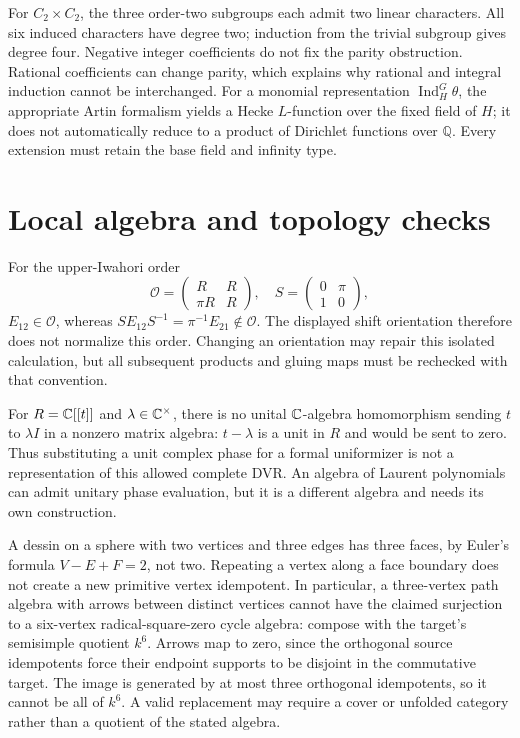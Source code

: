 For $C_2\times C_2$, the three order-two subgroups each admit two linear
characters. All six induced characters have degree two; induction from
the trivial subgroup gives degree four. Negative integer coefficients do
not fix the parity obstruction. Rational coefficients can change parity,
which explains why rational and integral induction cannot be interchanged.
For a monomial representation $\operatorname{Ind}_H^G\theta$, the appropriate
Artin formalism yields a Hecke $L$-function over the fixed field of $H$;
it does not automatically reduce to a product of Dirichlet functions over
$\mathbb Q$. Every extension must retain the base field and infinity type.

\section{Local algebra and topology checks}
For the upper-Iwahori order
\[
 \mathcal O=\begin{pmatrix}R&R\\\pi R&R\end{pmatrix},\quad
 S=\begin{pmatrix}0&\pi\\1&0\end{pmatrix},
\]
$E_{12}\in\mathcal O$, whereas
$SE_{12}S^{-1}=\pi^{-1}E_{21}\notin\mathcal O$.
The displayed shift orientation therefore does not normalize this order.
Changing an orientation may repair this isolated calculation, but all
subsequent products and gluing maps must be rechecked with that convention.

For $R=\mathbb C[[t]]$ and $\lambda\in\mathbb C^\times$, there is no unital
$\mathbb C$-algebra homomorphism sending $t$ to $\lambda I$ in a nonzero matrix
algebra: $t-\lambda$ is a unit in $R$ and would be sent to zero.
Thus substituting a unit complex phase for a formal uniformizer is not a
representation of this allowed complete DVR. An algebra of Laurent
polynomials can admit unitary phase evaluation, but it is a different
algebra and needs its own construction.

A dessin on a sphere with two vertices and three edges has three faces,
by Euler's formula $V-E+F=2$, not two. Repeating a vertex along a face
boundary does not create a new primitive vertex idempotent. In particular,
a three-vertex path algebra with arrows between distinct vertices cannot
have the claimed surjection to a six-vertex radical-square-zero cycle
algebra: compose with the target's semisimple quotient $k^6$. Arrows map
to zero, since the orthogonal source idempotents force their endpoint
supports to be disjoint in the commutative target. The image is generated
by at most three orthogonal idempotents, so it cannot be all of $k^6$.
A valid replacement may require a cover or unfolded category rather than
a quotient of the stated algebra.

